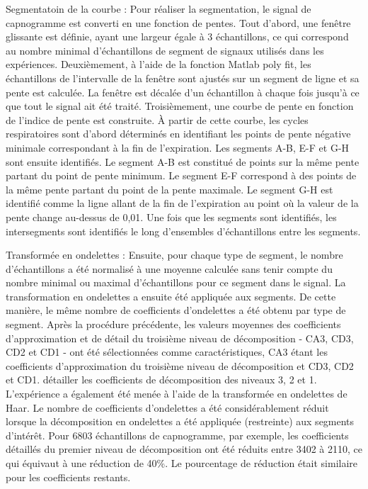 \documentclass[12pt,]{article}
\begin{document}
Segmentatoin de la courbe : Pour réaliser la segmentation, le signal de
capnogramme est converti en une fonction de pentes. Tout d'abord, une
fenêtre glissante est définie, ayant une largeur égale à 3 échantillons,
ce qui correspond au nombre minimal d'échantillons de segment de signaux
utilisés dans les expériences. Deuxièmement, à l'aide de la fonction
Matlab poly fit, les échantillons de l'intervalle de la fenêtre sont
ajustés sur un segment de ligne et sa pente est calculée. La fenêtre est
décalée d'un échantillon à chaque fois jusqu'à ce que tout le signal ait
été traité. Troisièmement, une courbe de pente en fonction de l'indice
de pente est construite. À partir de cette courbe, les cycles
respiratoires sont d'abord déterminés en identifiant les points de pente
négative minimale correspondant à la fin de l'expiration. Les segments
A-B, E-F et G-H sont ensuite identifiés. Le segment A-B est constitué de
points sur la même pente partant du point de pente minimum. Le segment
E-F correspond à des points de la même pente partant du point de la
pente maximale. Le segment G-H est identifié comme la ligne allant de la
fin de l'expiration au point où la valeur de la pente change au-dessus
de 0,01. Une fois que les segments sont identifiés, les intersegments
sont identifiés le long d'ensembles d'échantillons entre les segments.

Transformée en ondelettes : Ensuite, pour chaque type de segment, le
nombre d'échantillons a été normalisé à une moyenne calculée sans tenir
compte du nombre minimal ou maximal d'échantillons pour ce segment dans
le signal. La transformation en ondelettes a ensuite été appliquée aux
segments. De cette manière, le même nombre de coefficients d'ondelettes
a été obtenu par type de segment. Après la procédure précédente, les
valeurs moyennes des coefficients d'approximation et de détail du
troisième niveau de décomposition - CA3, CD3, CD2 et CD1 - ont été
sélectionnées comme caractéristiques, CA3 étant les coefficients
d'approximation du troisième niveau de décomposition et CD3, CD2 et CD1.
détailler les coefficients de décomposition des niveaux 3, 2 et 1.
L'expérience a également été menée à l'aide de la transformée en
ondelettes de Haar. Le nombre de coefficients d'ondelettes a été
considérablement réduit lorsque la décomposition en ondelettes a été
appliquée (restreinte) aux segments d'intérêt. Pour 6803 échantillons de
capnogramme, par exemple, les coefficients détaillés du premier niveau
de décomposition ont été réduits entre 3402 à 2110, ce qui équivaut à
une réduction de 40\%. Le pourcentage de réduction était similaire pour
les coefficients restants.
\end{document}
